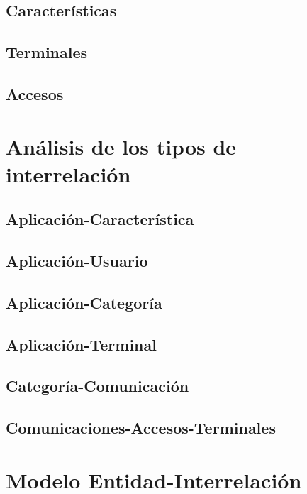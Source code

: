 \subsection{Características}

\subsection{Terminales}

\subsection{Accesos}


\section {Análisis de los tipos de interrelación}

\subsection{Aplicación-Característica}

\subsection{Aplicación-Usuario}

\subsection{Aplicación-Categoría}

\subsection{Aplicación-Terminal}

\subsection{Categoría-Comunicación}

\subsection{Comunicaciones-Accesos-Terminales}

\section{Modelo Entidad-Interrelación}
